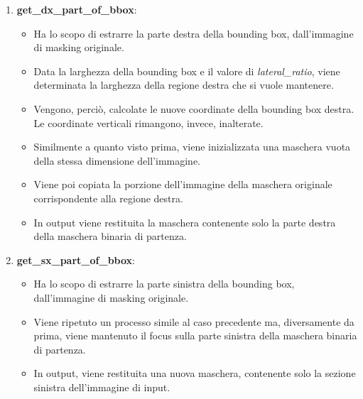 \documentclass[12pt,a4paper,openright,twoside]{book}
\begin{document}
\begin{enumerate}
\begin{figure}[H]
	\centering
    	
\end{figure} 

\item \textbf{get\_dx\_part\_of\_bbox}:
\begin{itemize}
\item Ha lo scopo di estrarre la parte destra della bounding box, dall'immagine di masking originale.
\item Data la larghezza della bounding box e il valore di {\itshape lateral\_ratio}, viene determinata la larghezza della regione destra che si vuole mantenere.
\item Vengono, perciò, calcolate le nuove coordinate della bounding box destra. Le coordinate verticali rimangono, invece, inalterate.
\item Similmente a quanto visto prima, viene inizializzata una maschera vuota della stessa dimensione dell'immagine.
\item Viene poi copiata la porzione dell'immagine della maschera originale corrispondente alla regione destra.
\item In output viene restituita la maschera contenente solo la parte destra della maschera binaria di partenza.
\end{itemize}

\item \textbf{get\_sx\_part\_of\_bbox}:
\begin{itemize}
\item Ha lo scopo di estrarre la parte sinistra della bounding box, dall'immagine di masking originale.
\item Viene ripetuto un processo simile al caso precedente ma, diversamente da prima, viene mantenuto il focus sulla parte sinistra della maschera binaria di partenza.
\item In output, viene restituita una nuova maschera, contenente solo la sezione sinistra dell'immagine di input.
\end{itemize}
\end{enumerate}
\end{document}
